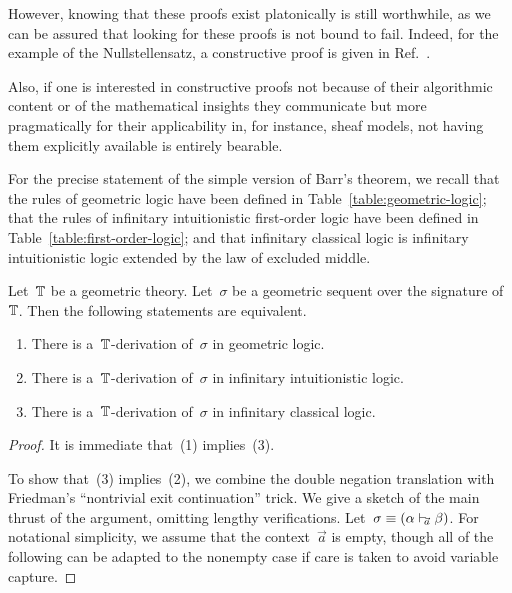 \documentclass{ws-rv9x6}
\begin{document}
{However, knowing that these proofs exist platonically is still worthwhile, as
we can be assured that looking for these proofs is not bound to fail. Indeed,
for the example of the Nullstellensatz, a constructive proof is given
in Ref.~\cite[Theorem~9.7]{lombardi-quitte:constructive-algebra}.

Also, if one is interested in constructive proofs not because of their
algorithmic content or of the mathematical insights they communicate but more
pragmatically for their applicability in, for instance, sheaf models, not
having them explicitly available is entirely bearable.

For the precise statement of the simple version of Barr's theorem, we recall
that the rules of geometric logic have been defined in
Table~\ref{table:geometric-logic}; that the rules of infinitary intuitionistic
first-order logic have been defined in Table~\ref{table:first-order-logic}; and
that infinitary classical logic is infinitary intuitionistic logic extended by
the law of excluded middle.
\begin{theorem}
\label{thm:baby-barr}
Let~$\mathbb{T}$ be a geometric theory.
Let~$\sigma$ be a geometric sequent over the signature of~$\mathbb{T}$. Then the
following statements are equivalent.
\begin{enumerate}
\item There is a~$\mathbb{T}$-derivation of~$\sigma$ in geometric logic.
\item There is a~$\mathbb{T}$-derivation of~$\sigma$ in infinitary intuitionistic
logic.
\item There is a~$\mathbb{T}$-derivation of~$\sigma$ in infinitary classical logic.
\end{enumerate}
\end{theorem}

\begin{proof}It is immediate that~(1) implies~(3).

To show that~(3) implies~(2), we combine the double negation translation
with Friedman's ``nontrivial exit continuation'' trick. We give a sketch of the
main thrust of the argument,
omitting lengthy verifications. Let~$\sigma \equiv (\alpha \mathrel{\vdash\!\!\!_{\vec a}} \beta)$.
For notational simplicity, we assume that the context~$\vec a$ is empty, though
all of the following can be adapted to the nonempty case if care is taken to
avoid variable capture.


\end{proof}}
\end{document}

